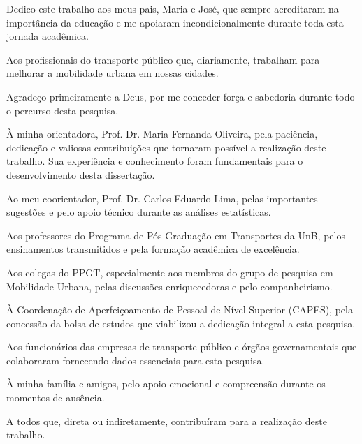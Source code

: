 \documentclass[mestrado,onehalfspacing,12pt,hyperref]{UnB-PPGT}
\begin{document}

\pretextual

\capa

\folhaderosto

\folhadeaprovacao

\fichacatalografica

\begin{dedicatoria}
Dedico este trabalho aos meus pais, Maria e José, que sempre acreditaram na importância da educação e me apoiaram incondicionalmente durante toda esta jornada acadêmica.

Aos profissionais do transporte público que, diariamente, trabalham para melhorar a mobilidade urbana em nossas cidades.
\end{dedicatoria}

\begin{agradecimentos}
Agradeço primeiramente a Deus, por me conceder força e sabedoria durante todo o percurso desta pesquisa.

À minha orientadora, Prof. Dr. Maria Fernanda Oliveira, pela paciência, dedicação e valiosas contribuições que tornaram possível a realização deste trabalho. Sua experiência e conhecimento foram fundamentais para o desenvolvimento desta dissertação.

Ao meu coorientador, Prof. Dr. Carlos Eduardo Lima, pelas importantes sugestões e pelo apoio técnico durante as análises estatísticas.

Aos professores do Programa de Pós-Graduação em Transportes da UnB, pelos ensinamentos transmitidos e pela formação acadêmica de excelência.

Aos colegas do PPGT, especialmente aos membros do grupo de pesquisa em Mobilidade Urbana, pelas discussões enriquecedoras e pelo companheirismo.

À Coordenação de Aperfeiçoamento de Pessoal de Nível Superior (CAPES), pela concessão da bolsa de estudos que viabilizou a dedicação integral a esta pesquisa.

Aos funcionários das empresas de transporte público e órgãos governamentais que colaboraram fornecendo dados essenciais para esta pesquisa.

À minha família e amigos, pelo apoio emocional e compreensão durante os momentos de ausência.

A todos que, direta ou indiretamente, contribuíram para a realização deste trabalho.
\end{agradecimentos}
\end{document}
